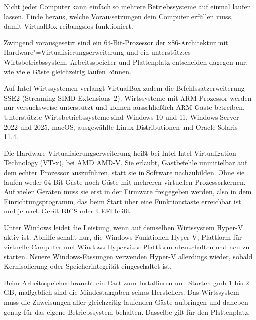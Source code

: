 \begin{aufgabe}
Nicht jeder Computer kann einfach so mehrere Betriebssysteme auf einmal laufen lassen. Finde heraus, welche Voraussetzungen dein Computer erfüllen muss, damit VirtualBox reibungslos funktioniert.
\end{aufgabe}
\label{sec:voraussetzungen}

Zwingend vorausgesetzt sind ein 64-Bit-Prozessor der x86-Architektur mit Hardware"=Virtualisierungserweiterung und ein unterstütztes Wirtsbetriebssystem. Arbeitsspeicher und Plattenplatz entscheiden dagegen nur, wie viele Gäste gleichzeitig laufen können.

Auf Intel-Wirtssystemen verlangt VirtualBox zudem die Befehlssatzerweiterung SSE2 (Streaming SIMD Extensions~2). Wirtssysteme mit ARM-Prozessor werden nur versuchsweise unterstützt und können ausschließlich ARM-Gäste betreiben. Unterstützte Wirtsbetriebssysteme sind Windows 10 und 11, Windows Server 2022 und 2025, macOS, ausgewählte Linux-Distributionen und Oracle Solaris 11.4.

Die Hardware-Virtualisierungserweiterung heißt bei Intel Intel Virtualization Technology (VT-x), bei AMD AMD-V. Sie erlaubt, Gastbefehle unmittelbar auf dem echten Prozessor auszuführen, statt sie in Software nachzubilden. Ohne sie laufen weder 64-Bit-Gäste noch Gäste mit mehreren virtuellen Prozessorkernen. Auf vielen Geräten muss sie erst in der Firmware freigegeben werden, also in dem Einrichtungsprogramm, das beim Start über eine Funktionstaste erreichbar ist und je nach Gerät BIOS oder UEFI heißt.

Unter Windows leidet die Leistung, wenn auf demselben Wirtssystem Hyper-V aktiv ist. Abhilfe schafft nur, die Windows-Funktionen Hyper-V, Plattform für virtuelle Computer und Windows-Hypervisor-Plattform abzuschalten und neu zu starten. Neuere Windows-Fassungen verwenden Hyper-V allerdings wieder, sobald Kernisolierung oder Speicherintegrität eingeschaltet ist.

Beim Arbeitsspeicher braucht ein Gast zum Installieren und Starten grob 1 bis 2\,GB, maßgeblich sind die Mindestangaben seines Herstellers. Das Wirtssystem muss die Zuweisungen aller gleichzeitig laufenden Gäste aufbringen und daneben genug für das eigene Betriebssystem behalten. Dasselbe gilt für den Plattenplatz.


